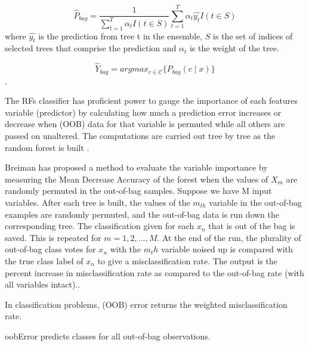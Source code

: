 \begin{equation}\label{eq:maximum_posteriori}
\hat{P}_{bag}= \frac{1}{\sum_{t=1}^{T} \alpha_t I(t\in S)} \sum_{t=1}^{T} \alpha_t \hat{y_t} I(t\in S)
\end{equation}
where $\hat{y_t}$ is the prediction from tree t in the ensemble, $S$ is the set of indices of selected trees that comprise the prediction and $\alpha_t$ is the weight of the tree.


\begin{equation}\label{eq:maximum_posteriori}
\hat{Y}_{bag}= argmax_{c \in \mathcal{C}} \{ P_{bag}(c \mid x)\}
\end{equation}.



 


The RFs classifier has proficient power to gauge the importance of each features variable (predictor) \citep{breiman2001random} by calculating how much a prediction error increases or decrease  when (OOB) data for that variable is permuted while all others are passed on unaltered. The computations are carried out tree by tree as the random forest is built \citep{breiman2001random,breiman2002manual,liaw2002classification}.


Breiman has proposed a method to evaluate the variable importance by measuring the Mean Decrease Accuracy of the forest when the values of $X_m$ are randomly permuted in the out-of-bag samples. Suppose we have M input variables. After each tree is built, the values of the $m_{th}$ variable in the out-of-bag examples are randomly permuted, and the out-of-bag data is run down the corresponding tree. The classification given for each $x_n$ that is out of the bag is saved. This is repeated for $m=1,2, ... , M$. At the end of the run, the plurality of out-of-bag class votes for $x_n$ with the $m_th$ variable noised up is compared with the true class label of $x_n$ to give a misclassification rate. The output is the percent increase in misclassification rate as compared to the out-of-bag rate (with all variables intact).\citep{breiman2001random,louppe2013understanding}.


In classification problems, (OOB) error returns the weighted misclassification rate.

oobError predicts classes for all out-of-bag observations.

